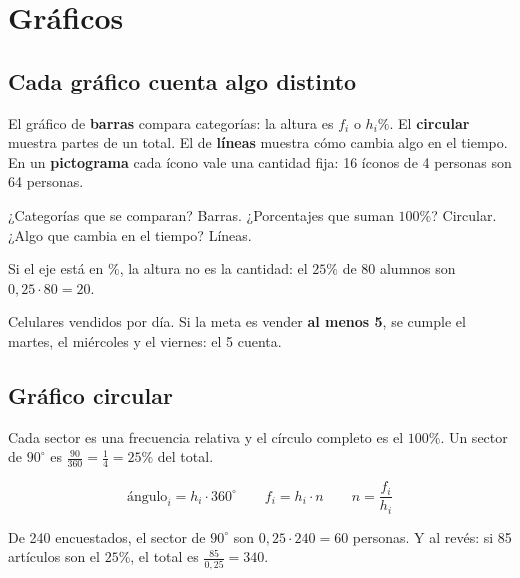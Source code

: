 \section{Gráficos}

\subsection{Cada gráfico cuenta algo distinto}
El gráfico de \textbf{barras} compara categorías: la altura es $f_i$ o $h_i\%$. El \textbf{circular} muestra partes de un total. El de \textbf{líneas} muestra cómo cambia algo en el tiempo. En un \textbf{pictograma} cada ícono vale una cantidad fija: 16 íconos de 4 personas son 64 personas.

\begin{clave} ¿Categorías que se comparan? Barras. ¿Porcentajes que suman $100\%$? Circular. ¿Algo que cambia en el tiempo? Líneas.\end{clave}
\begin{ojo} Si el eje está en $\%$, la altura no es la cantidad: el $25\%$ de 80 alumnos son $0{,}25\cdot 80 = 20$.\end{ojo}

\begin{minipage}[c]{0.46\linewidth}\centering
{}
\end{minipage}\hfill
\begin{minipage}[c]{0.5\linewidth}
Celulares vendidos por día. Si la meta es vender \textbf{al menos 5}, se cumple el martes, el miércoles y el viernes: el 5 cuenta.
\end{minipage}

\subsection{Gráfico circular}
Cada sector es una frecuencia relativa y el círculo completo es el $100\%$. Un sector de $90^\circ$ es $\frac{90}{360} = \frac14 = 25\%$ del total.
\begin{clave}[Circular] \[ \text{ángulo}_i = h_i\cdot 360^\circ \qquad f_i = h_i\cdot n \qquad n = \frac{f_i}{h_i} \]\end{clave}
\begin{ejemplo} De 240 encuestados, el sector de $90^\circ$ son $0{,}25\cdot 240 = 60$ personas. Y al revés: si 85 artículos son el $25\%$, el total es $\frac{85}{0{,}25} = 340$.\end{ejemplo}

